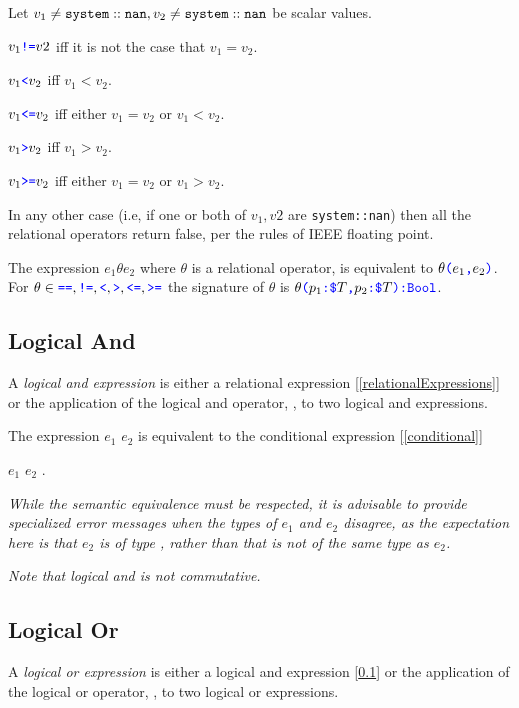 \documentclass{article}
\begin{document}
{Let $v_1 \ne {\tt system::nan}, v_2 \ne {\tt system::nan}$ be scalar values. 

$v_1 \texttt{\color{blue} !=}{} v2$ iff it is not the case that $v_1 = v_2$.

$v_1 \texttt{\color{blue} \tt<}{} v_2$ iff $v_1 < v_2$.

$v_1 \texttt{\color{blue} \tt<=}{} v_2$ iff either $v_1 = v_2$ or $v_1 < v_2$.

$v_1 \texttt{\color{blue} \tt>}{} v_2$ iff $v_1 > v_2$.

$v_1 \texttt{\color{blue} \tt>=}{} v_2$ iff either $v_1 = v_2$ or $v_1 > v_2$.

In any other case (i.e, if one or both of $v_1, v2$ are {\tt system::nan}) then all the relational operators return false, per the rules of IEEE floating point.

\RelExpression{}
\RelOp{}

The expression $e_1 \theta e_2$ where $\theta$ is a relational operator, is equivalent to $\theta\texttt{\color{blue} (}{}e_1\texttt{\color{blue} ,}{} e_2\texttt{\color{blue} )}$. For $\theta{} \in \texttt{\color{blue} ==}{}, \texttt{\color{blue} !=}{}, \texttt{\color{blue} \tt<}{}, \texttt{\color{blue} \tt>}{}, \texttt{\color{blue} \tt<=}{}, \texttt{\color{blue} \tt>=}{}$ the signature of $\theta$ is $\theta\texttt{\color{blue} (}{}p_1\texttt{\color{blue} :}{} \texttt{\color{blue} \$}{}T\texttt{\color{blue} ,}{} p_2\texttt{\color{blue} :}{} \texttt{\color{blue} \$}{}T\texttt{\color{blue} )}\texttt{\color{blue} :}{}\texttt{\color{blue} Bool}$.


\subsection{Logical And}
\label{logicalAnd}

A {\em logical and expression} is either a relational expression [\ref{relationalExpressions}] or the application of the logical and operator, \AND{}, to two logical and expressions.

\AndExpression{}

The expression $e_1$ \AND{} $e_2$ is equivalent to the conditional expression [\ref{conditional}] 

\IF{} $e_1$ \THEN{} $e_2$ \ELSE{} \FALSE{}.

{\em While the semantic equivalence must be respected, it is advisable to provide specialized error messages when the types of $e_1$ and $e_2$ disagree,  as the expectation here is that $e_2$ is of type \BOOL{}, rather than that \FALSE{} is not of the same type as $e_2$.
}

{\em
Note that logical and is not commutative.
}

\subsection{Logical Or}
\label{logicalOr}

A {\em logical or expression} is either a logical and expression [\ref{logicalAnd}] or the application of the logical or operator, \AND{}, to two logical or expressions.

}
\end{document}
